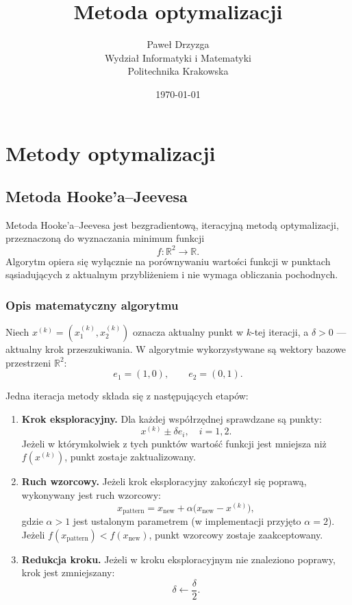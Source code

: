 \documentclass[10pt,a4paper]{article}
\title{Metoda optymalizacji}
\author{Paweł Drzyzga \\ Wydział Informatyki i Matematyki \\ Politechnika Krakowska}
\date{\today}
\begin{document}
\maketitle


\tableofcontents
\clearpage

\section{Metody optymalizacji}

\subsection{Metoda Hooke’a--Jeevesa}

Metoda Hooke’a--Jeevesa jest bezgradientową, iteracyjną metodą optymalizacji,
przeznaczoną do wyznaczania minimum funkcji
\[
f:\mathbb{R}^2 \to \mathbb{R}.
\]
Algorytm opiera się wyłącznie na porównywaniu wartości funkcji w punktach
sąsiadujących z aktualnym przybliżeniem i nie wymaga obliczania pochodnych.

\subsubsection{Opis matematyczny algorytmu}

Niech $x^{(k)} = (x_1^{(k)}, x_2^{(k)})$ oznacza aktualny punkt w $k$-tej iteracji,
a $\delta > 0$ — aktualny krok przeszukiwania.
W algorytmie wykorzystywane są wektory bazowe przestrzeni $\mathbb{R}^2$:
\[
e_1 = (1,0), \qquad e_2 = (0,1).
\]

Jedna iteracja metody składa się z następujących etapów:

\begin{enumerate}
\item \textbf{Krok eksploracyjny.}
Dla każdej współrzędnej sprawdzane są punkty:
\[
x^{(k)} \pm \delta e_i, \quad i=1,2.
\]
Jeżeli w którymkolwiek z tych punktów wartość funkcji jest mniejsza niż
$f(x^{(k)})$, punkt zostaje zaktualizowany.

\item \textbf{Ruch wzorcowy.}
Jeżeli krok eksploracyjny zakończył się poprawą, wykonywany jest ruch wzorcowy:
\[
x_{\text{pattern}} = x_{\text{new}} + \alpha \bigl(x_{\text{new}} - x^{(k)}\bigr),
\]
gdzie $\alpha > 1$ jest ustalonym parametrem (w implementacji przyjęto $\alpha=2$).
Jeżeli $f(x_{\text{pattern}}) < f(x_{\text{new}})$, punkt wzorcowy zostaje zaakceptowany.

\item \textbf{Redukcja kroku.}
Jeżeli w kroku eksploracyjnym nie znaleziono poprawy, krok jest zmniejszany:
\[
\delta \leftarrow \frac{\delta}{2}.
\]
\end{enumerate}
\end{document}
